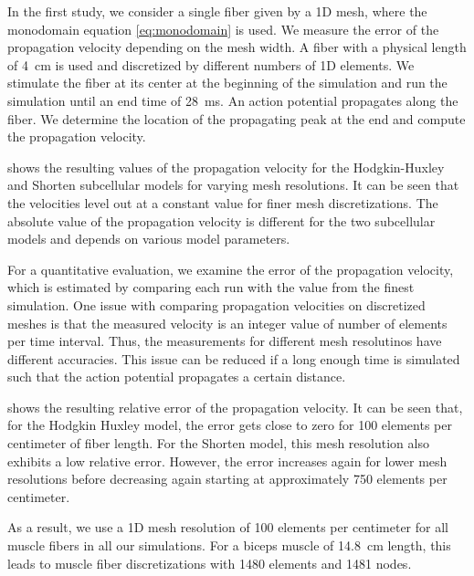 In the first study, we consider a single fiber given by a 1D mesh, where the monodomain equation \cref{eq:monodomain} is used.
We measure the error of the propagation velocity depending on the mesh width. A fiber with a physical length of \SI{4}{\cm} is used and discretized by different numbers of 1D elements. We stimulate the fiber at its center at the beginning of the simulation and run the simulation until an end time of \SI{28}{\ms}. An action potential propagates along the fiber. We determine the location of the propagating peak at the end and compute the propagation velocity.

 shows the resulting values of the propagation velocity for the Hodgkin-Huxley and Shorten subcellular models for varying mesh resolutions. It can be seen that the velocities level out at a constant value for finer mesh discretizations. The absolute value of the propagation velocity is different for the two subcellular models and depends on various model parameters.

For a quantitative evaluation, we examine the error of the propagation velocity, which is estimated by comparing each run with the value from the finest simulation. 
One issue with comparing propagation velocities on discretized meshes is that the measured velocity is an integer value of number of elements per time interval. Thus, the measurements for different mesh resolutinos have different accuracies. This issue can be reduced if a long enough time is simulated such that the action potential propagates a certain distance.

 shows the resulting relative error of the propagation velocity. It can be seen that, for the Hodgkin Huxley model, the error gets close to zero for 100 elements per centimeter of fiber length. For the Shorten model, this mesh resolution also exhibits a low relative error. However, the error increases again for lower mesh resolutions before decreasing again starting at approximately 750 elements per centimeter. 

As a result, we use a 1D mesh resolution of 100 elements per centimeter for all muscle fibers in all our simulations. For a biceps muscle of \SI{14.8}{\cm} length, this leads to muscle fiber discretizations with 1480 elements and 1481 nodes.

